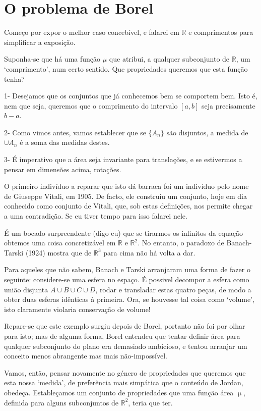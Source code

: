 \documentclass{article}
\newcommand{\R}{\mathbb{R}}
\DeclareMathOperator{\mmu}{\mu}
\begin{document}
\section{O problema de Borel}

Começo por expor o melhor caso concebível, e falarei em $\R$ e comprimentos para simplificar a exposição.

Suponha-se que há uma função $\mu$ que atribui, a qualquer subconjunto de $\R$, um `comprimento', num certo sentido. Que propriedades queremos que esta função tenha?

1- Desejamos que os conjuntos que já conhecemos bem se comportem bem. Isto é, nem que seja, queremos que o comprimento do intervalo $[a,b]$ seja precisamente $b-a$.

2- Como vimos antes, vamos establecer que se $\{A_n\}$ são disjuntos, a medida de $\cup A_n$ é a soma das medidas destes.

3- É imperativo que a área seja invariante para translações, e se estivermos a pensar em dimensões acima, rotações.

O primeiro indivíduo a reparar que isto dá barraca foi um indivíduo pelo nome de Giuseppe Vitali, em 1905. De facto, ele construiu um conjunto, hoje em dia conhecido como conjunto de Vitali, que, sob estas definições, nos permite chegar a uma contradição. Se eu tiver tempo para isso falarei nele.

É um bocado surpreendente (digo eu) que se tirarmos os infinitos da equação obtemos uma coisa concretizável em $\R$ e $\R^2$. No entanto, o paradoxo de Banach-Tarski (1924) mostra que de $\R^3$ para cima não há volta a dar.

Para aqueles que não sabem, Banach e Tarski arranjaram uma forma de fazer o seguinte: considere-se uma esfera no espaço. É possivel decompor a esfera como união disjunta $A \cup B \cup C \cup D$, rodar e transladar estas quatro peças, de modo a obter duas esferas idênticas à primeira. Ora, se houvesse tal coisa como `volume', isto claramente violaria conservação de volume!

Repare-se que este exemplo surgiu depois de Borel, portanto não foi por olhar para isto; mas de alguma forma, Borel entendeu que tentar definir área para qualquer subconjunto do plano era demasiado ambicioso, e tentou arranjar um conceito menos abrangente mas mais não-impossível.


Vamos, então, pensar novamente no género de propriedades que queremos que esta nossa `medida', de preferência mais simpática que o conteúdo de Jordan, obedeça. Estableçamos um conjunto de propriedades que uma função área $\mmu$, definida para alguns subconjuntos de $\R^2$, teria que ter.
\end{document}
